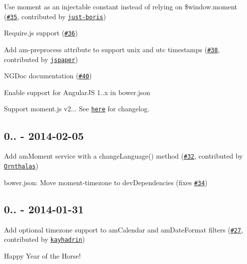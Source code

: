 \begin{DoxyItemize}
\item Use {\ttfamily moment} as an injectable constant instead of relying on {\ttfamily \$window.\+moment} (\href{https://github.com/urish/angular-moment/pull/35}{\tt \#35}, contributed by \href{https://github.com/just-boris}{\tt just-\/boris})
\item Require.\+js support (\href{https://github.com/urish/angular-moment/issues/36}{\tt \#36})
\item Add am-\/preprocess attribute to support unix and utc timestamps (\href{https://github.com/urish/angular-moment/pull/38}{\tt \#38}, contributed by \href{https://github.com/jspaper}{\tt jspaper})
\item N\+G\+Doc documentation (\href{https://github.com/urish/angular-moment/issues/40}{\tt \#40})
\item Enable support for Angular\+JS 1..\+x in bower.\+json
\item Support moment.\+js v2... See \href{https://gist.github.com/ichernev/10544682}{\tt here} for changelog.
\end{DoxyItemize}

\subsection*{0.. -\/ 2014-\/02-\/05}


\begin{DoxyItemize}
\item Add {\ttfamily am\+Moment} service with a {\ttfamily change\+Language()} method (\href{https://github.com/urish/angular-moment/pull/32}{\tt \#32}, contributed by \href{https://github.com/Ornthalas}{\tt Ornthalas})
\item bower.\+json\+: Move {\ttfamily moment-\/timezone} to dev\+Dependencies (fixes \href{https://github.com/urish/angular-moment/issues/34}{\tt \#34})
\end{DoxyItemize}

\subsection*{0.. -\/ 2014-\/01-\/31}


\begin{DoxyItemize}
\item Add optional timezone support to {\ttfamily am\+Calendar} and {\ttfamily am\+Date\+Format} filters (\href{https://github.com/urish/angular-moment/pull/27}{\tt \#27}, contributed by \href{https://github.com/kayhadrin}{\tt kayhadrin})
\item Happy Year of the Horse!
\end{DoxyItemize}

